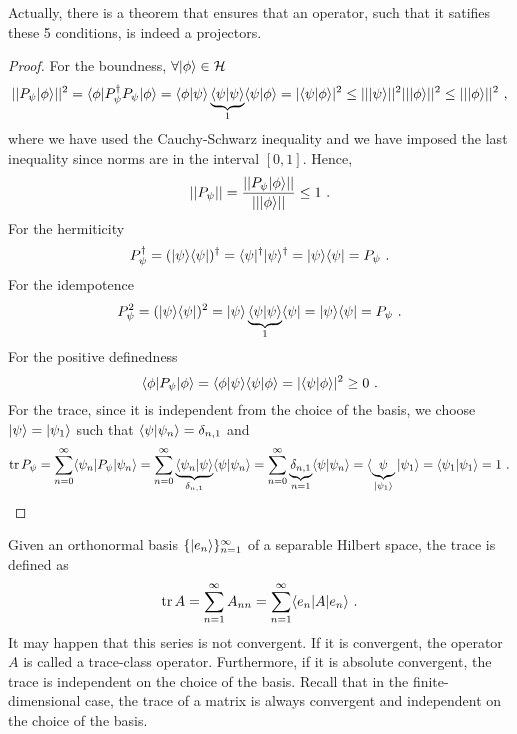     Actually, there is a theorem that ensures that an operator, such that it satifies these 5 conditions, is indeed a projectors.
    \begin{proof}
        For the boundness, $\forall \vert\phi\rangle \in \mathcal H$
        \begin{equation*}
            ||P_\psi \vert\phi\rangle||^2 = \langle\phi\vert P_\psi^\dagger P_\psi \vert\phi\rangle = \langle\phi\vert\psi\rangle \underbrace{\langle\psi\vert\psi\rangle}_1 \langle\psi\vert\phi\rangle = |\langle\psi\vert\phi\rangle|^2 \leq ||\vert\psi\rangle||^2 ||\vert\phi\rangle||^2 \leq ||\vert\phi\rangle||^2 ~,
        \end{equation*}
        where we have used the Cauchy-Schwarz inequality and we have imposed the last inequality since norms are in the interval $[0, 1]$. Hence,
        \begin{equation*}
            ||P_\psi|| = \frac{||P_\psi \vert\phi\rangle||}{||\vert\phi\rangle||} \leq 1 ~.
        \end{equation*}
        For the hermiticity
        \begin{equation*}
            P_\psi^\dagger = (\vert\psi\rangle \langle\psi\vert)^\dagger = \langle\psi\vert^\dagger \vert\psi\rangle^\dagger = \vert\psi\rangle \langle\psi\vert = P_\psi ~.
        \end{equation*}
        For the idempotence
        \begin{equation*}
            P_\psi^2 = (\vert\psi\rangle \langle\psi\vert)^2 = \vert\psi\rangle \underbrace{\langle\psi\vert\psi\rangle}_1 \langle\psi\vert = \vert\psi\rangle \langle\psi\vert = P_\psi ~.
        \end{equation*}
        For the positive definedness 
        \begin{equation*}
            \langle\phi\vert P_\psi \vert\phi\rangle = \langle\phi\vert\psi\rangle \langle\psi\vert\phi\rangle = |\langle\psi\vert\phi\rangle|^2 \geq 0 ~.
        \end{equation*}
        For the trace, since it is independent from the choice of the basis, we choose $\vert\psi\rangle = \vert\psi_1\rangle$ such that $\langle\psi\vert\psi_n\rangle = \delta_{n,1}$ and 
        \begin{equation*}
            \operatorname{tr} P_\psi = \sum_{n=0}^{\infty} \langle\psi_n\vert P_\psi \vert\psi_n\rangle = \sum_{n=0}^{\infty} \underbrace{\langle\psi_n\vert\psi\rangle}_{\delta_{n,1}} \langle\psi\vert\psi_n\rangle = \sum_{n=0}^{\infty} \underbrace{\delta_{n,1}}_{n=1} \langle\psi\vert\psi_n\rangle = \langle\underbrace{\psi}_{\vert\psi_1\rangle}\vert\psi_1\rangle = \langle\psi_1\vert\psi_1\rangle = 1 ~.
        \end{equation*}
    \end{proof}

    Given an orthonormal basis $\{\vert e_n\rangle\}_{n=1}^\infty$ of a separable Hilbert space, the trace is defined as 
    \begin{equation*}
        \operatorname{tr} A = \sum_{n=1}^\infty A_{nn} = \sum_{n=1}^\infty \langle e_n\vert A \vert e_n\rangle ~.
    \end{equation*}
    It may happen that this series is not convergent. If it is convergent, the operator $A$ is called a trace-class operator. Furthermore, if it is absolute convergent, the trace is independent on the choice of the basis. Recall that in the finite-dimensional case, the trace of a matrix is always convergent and independent on the choice of the basis.

